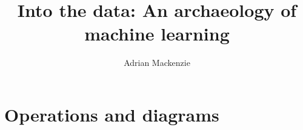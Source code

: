 \documentclass[a4paper,11pt]{book}
\title{ Into the data: An archaeology of machine learning}
\author{Adrian Mackenzie}
\begin{document}
\frontmatter
\maketitle


\tableofcontents
\listoffigures
\listoftables
\mainmatter

\cleardoublepage {} {}
\part*{Operations and diagrams}


%
%
%
%
%
%
%
%
\backmatter
\printindex
\end{document}
